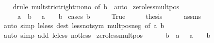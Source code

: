 \begin{isabellebody}
%
\isadelimproof
\ \ %
\endisadelimproof
%
\isatagproof
{}\isamarkupfalse%
\ {\isacharparenleft}{\kern0pt}drule\ mult{\isacharunderscore}{\kern0pt}strict{\isacharunderscore}{\kern0pt}right{\isacharunderscore}{\kern0pt}mono\ {\isacharbrackleft}{\kern0pt}of\ b\ {}{\isacharbrackright}{\kern0pt}{\isacharparenright}{\kern0pt}\ auto%
\endisatagproof
{\isafoldproof}%
%
\isadelimproof
\isanewline
%
\endisadelimproof
\isanewline
{}\isamarkupfalse%
\ zero{\isacharunderscore}{\kern0pt}less{\isacharunderscore}{\kern0pt}mult{\isacharunderscore}{\kern0pt}pos{\isacharcolon}{\kern0pt}\ \isanewline
\ \ \ {\isachardoublequoteopen}{}\ {\isacharless}{\kern0pt}\ a\ {\isacharasterisk}{\kern0pt}\ b{\isachardoublequoteclose}\ {\isachardoublequoteopen}{}\ {\isacharless}{\kern0pt}\ a{\isachardoublequoteclose}\ \ {\isachardoublequoteopen}{}\ {\isacharless}{\kern0pt}\ b{\isachardoublequoteclose}\isanewline
%
\isadelimproof
%
\endisadelimproof
%
\isatagproof
{}\isamarkupfalse%
\ {\isacharparenleft}{\kern0pt}cases\ {\isachardoublequoteopen}b\ {\isasymle}\ {}{\isachardoublequoteclose}{\isacharparenright}{\kern0pt}\isanewline
\ \ \isamarkupfalse%
\ True\isanewline
\ \ \isamarkupfalse%
\ \isamarkupfalse%
\ {\isacharquery}{\kern0pt}thesis\isanewline
\ \ \ \ \isamarkupfalse%
\ assms\ \isamarkupfalse%
\ {\isacharparenleft}{\kern0pt}auto\ simp{\isacharcolon}{\kern0pt}\ le{\isacharunderscore}{\kern0pt}less\ dest{\isacharcolon}{\kern0pt}\ less{\isacharunderscore}{\kern0pt}not{\isacharunderscore}{\kern0pt}sym\ mult{\isacharunderscore}{\kern0pt}pos{\isacharunderscore}{\kern0pt}neg\ {\isacharbrackleft}{\kern0pt}of\ a\ b{\isacharbrackright}{\kern0pt}{\isacharparenright}{\kern0pt}\isanewline
{}\isamarkupfalse%
\ {\isacharparenleft}{\kern0pt}auto\ simp\ add{\isacharcolon}{\kern0pt}\ le{\isacharunderscore}{\kern0pt}less\ not{\isacharunderscore}{\kern0pt}less{\isacharparenright}{\kern0pt}%
\endisatagproof
{\isafoldproof}%
%
\isadelimproof
\isanewline
%
\endisadelimproof
\isanewline
\isanewline
{}\isamarkupfalse%
\ zero{\isacharunderscore}{\kern0pt}less{\isacharunderscore}{\kern0pt}mult{\isacharunderscore}{\kern0pt}pos{}{\isacharcolon}{\kern0pt}\ \isanewline
\ \ \ {\isachardoublequoteopen}{}\ {\isacharless}{\kern0pt}\ b\ {\isacharasterisk}{\kern0pt}\ a{\isachardoublequoteclose}\ {\isachardoublequoteopen}{}\ {\isacharless}{\kern0pt}\ a{\isachardoublequoteclose}\ \ {\isachardoublequoteopen}{}\ {\isacharless}{\kern0pt}\ b{\isachardoublequoteclose}\isanewline

\end{isabellebody}
